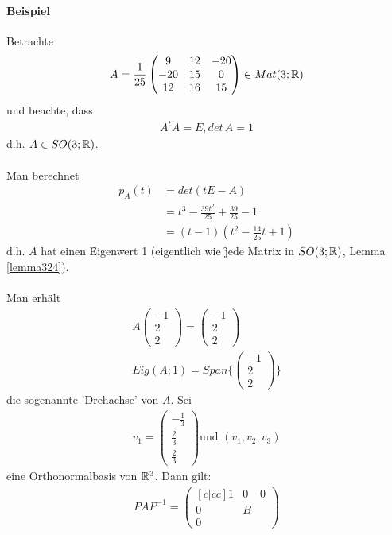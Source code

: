 \paragraph{Beispiel}
Betrachte
\begin{align}
A = \frac{1}{25} \begin{pmatrix} 9 & 12 & -20 \\ -20 & 15 & 0 \\ 12 & 16 & 15 \end{pmatrix} \in Mat(3; \mathbb{R})
\end{align}
und beachte, dass
\begin{align}
A^t A = E, det\, A = 1
\end{align}
d.h. $A \in SO(3; \mathbb{R})$.\\\\
Man berechnet
\begin{align}
p_A(t) &= det(t E - A) \\
&= t^3 - \frac{39t^2}{25} + \frac{39}{25} - 1 \\
&= (t-1)(t^2-\frac{14}{25}t +1)
\end{align}
d.h. $A$ hat einen \f{Eigenwert 1} (eigentlich wie  \f{jede} Matrix in $SO(3; \mathbb{R})$, Lemma \ref{lemma324}).\\\\
Man erhält
\begin{align}
A \begin{pmatrix} -1 \\ 2 \\ 2 \end{pmatrix} = \begin{pmatrix} -1 \\ 2 \\ 2 \end{pmatrix} \\
Eig(A; 1) = Span\{\begin{pmatrix} -1 \\ 2 \\ 2 \end{pmatrix}\}
\end{align}
die sogenannte 'Drehachse' von $A$. Sei
\begin{align}
v_1 = \begin{pmatrix} - \frac{1}{3} \\ \frac{2}{3} \\ \frac{2}{3} \end{pmatrix}
\text{und } (v_1, v_2, v_3)
\end{align}
eine Orthonormalbasis von $\mathbb{R}^3$.
Dann gilt:
\begin{align}
PAP^{-1} = \begin{pmatrix}[c|cc] 1 & 0 & 0 \\ \hline 0 & B & \\ 0 & & \end{pmatrix}
\end{align}

